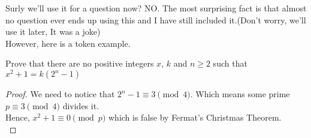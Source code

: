 Surly we'll use it for a question now? NO. The most surprising fact is that almost no question ever ends up using this and I have still included it.(Don't worry, we'll use it later, It was a joke)\\
However, here is a token example.\\
\begin{example}
     Prove that there are no positive integers $x$, $k$ and $n \geq 2$ such that $x^2 + 1 = k(2^n - 1)$
\end{example}
\begin{proof}
    We need to notice that $2^n-1 \equiv 3 \pmod{4}$. Which means some prime $p \equiv 3 \pmod{4}$ divides it.\\
    Hence, $x^2+1 \equiv 0 \pmod{p}$ which is false by Fermat's Christmas Theorem.\\
\end{proof}
